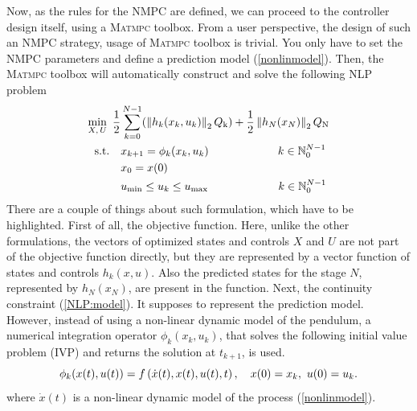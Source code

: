 Now, as the rules for the NMPC are defined, we can proceed to the controller design itself, using a \textsc{Matmpc} toolbox. From a user perspective, the design of such an NMPC strategy, usage of \textsc{Matmpc} toolbox is trivial. You only have to set the NMPC parameters and define a prediction model (\ref{nonlinmodel}). Then, the \textsc{Matmpc} toolbox will automatically construct and solve the following NLP problem
\begin{subequations}\label{NLP}
	\begin{align}
	\min_{X,\,U}\ \frac{1}{2}&\sum_{k=0}^{N-1} (\left\| h_k(x_k, u_k)\right\|_2Q _{\text{k}}) + \frac{1}{2}\left\|h_N(x_N)\right\|_2Q _{\text{N}}\label{NLP:obj}\\
	\text{s.t.}\quad &x_{k+1} = \phi_k(x_{k},u_{k})\qquad\qquad\qquad\, k \in \mathbb{N}_0^{N-1}\label{NLP:model}\\
	&x_0 = x(0)\\
	&u _{\text{min}}\leq u_{k}\leq u _{\text{max}}\qquad\qquad\qquad\;   k \in \mathbb{N}_0^{N-1}	
	\end{align}
\end{subequations}
There are a couple of things about such formulation, which have to be highlighted. First of all, the objective function. Here, unlike the other formulations, the vectors of optimized states and controls $X$ and $U$ are not part of the objective function directly, but they are represented by a vector function of states and controls $h_k(x, u)$. Also the predicted states for the stage $N$, represented by $h_N(x_N)$, are present in the function. Next, the continuity constraint (\ref{NLP:model}). It supposes to represent the prediction model. However, instead of using a non-linear dynamic model of the pendulum,  a numerical integration operator $\phi_k(x_{k},u_{k})$, that solves the following initial value problem (IVP) and returns the solution at $t_{k+1}$, is used. 
\begin{equation}
\phi_k(x(t),u(t))=f\left( \dot{x}(t), x(t),u(t),t \right),\quad x(0)=x_k,\ u(0)=u_k.
\end{equation}
where $\dot{x}(t)$ is a non-linear dynamic model of the process (\ref{nonlinmodel}).

